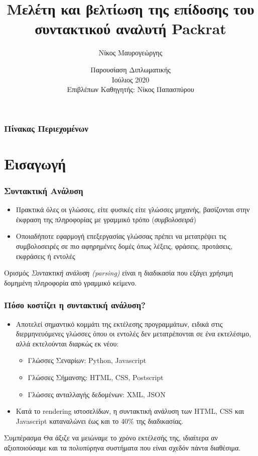 \documentclass{beamer}
\title[Μελέτη και βελτίωση της επίδοσης του συντακτικού αναλυτή Packrat] %
{Μελέτη και βελτίωση της επίδοσης του συντακτικού αναλυτή Packrat}
\author[Νίκος, Μαυρογεώργης] %
{Νίκος Μαυρογεώργης}
\institute[ECE, NTUA] %
{
  Σχολή Ηλεκτρολόγων Μηχανικών και Μηχανικών Υπολογιστών\\
  Εθνικό Μετσόβειο Πολυτεχνείο
}
\date[NTUA 2020] %
{Παρουσίαση Διπλωματικής \\ Ιούλιος 2020 \\ Επιβλέπων Καθηγητής: Νίκος Παπασπύρου}
\begin{document}
\frame{\titlepage}

\begin{frame}
\frametitle{Πίνακας Περιεχομένων}
\tableofcontents
\end{frame}

\section{Εισαγωγή}

\begin{frame}
  \frametitle{Συντακτική Ανάλυση}
  \begin{itemize}	
	\item Πρακτικά όλες οι γλώσσες, είτε φυσικές είτε γλώσσες μηχανής, βασίζονται στην έκφραση της πληροφορίας με γραμμικό τρόπο (\textit{συμβολοσειρά}) \pause
	\item Οποιαδήποτε εφαρμογή επεξεργασίας γλώσσας πρέπει να μετατρέψει τις συμβολοσειρές σε πιο αφηρημένες δομές όπως λέξεις, φράσεις, προτάσεις, εκφράσεις ή εντολές \pause
  \end{itemize}

\begin{block}{Ορισμός}
  \textit{Συντακτική ανάλυση (parsing)} είναι η διαδικασία που εξάγει χρήσιμη δομημένη πληροφορία από γραμμικό κείμενο.
\end{block}

\end{frame}

\begin{frame}
  \frametitle{Πόσο κοστίζει η συντακτική ανάλυση?} \pause
  \begin{itemize}
	\item Αποτελεί σημαντικό κομμάτι της εκτέλεσης προγραμμάτων, ειδικά στις διερμηνευόμενες γλώσσες όπου οι εντολές δεν μετατρέπονται σε ένα εκτελέσιμο, αλλά εκτελούνται διαρκώς εκ νέου:
  \begin{itemize}
	\item Γλώσσες Σεναρίων: Python, Javascript
	\item Γλώσσες Σήμανσης: HTML, CSS, Postscript
	\item Γλώσσες ανταλλαγής δεδομένων: XML, JSON \pause
  \end{itemize}
\item Κατά το rendering ιστοσελίδων, η συντακτική ανάλυση των HTML, CSS και Javascript καταναλώνει έως και το 40\% της διαδικασίας. \pause
  \end{itemize}

  \begin{block}{Συμπέρασμα}
	Θα άξιζε να μειώναμε το χρόνο εκτέλεσής της, ιδιαίτερα αν αξιοποιούσαμε και τα πολυπύρηνα συστήματα που είναι σχεδόν πάντα διαθέσιμα.
  \end{block}
\end{frame}
\end{document}
